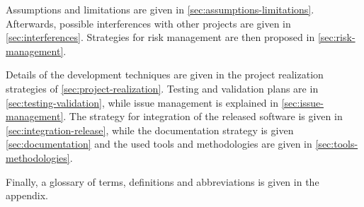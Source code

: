 Assumptions and limitations are given in \autoref{sec:assumptions-limitations}.
Afterwards, possible interferences with other projects are given in \autoref{sec:interferences}.
Strategies for risk management are then proposed in \autoref{sec:risk-management}.

Details of the development techniques are given in the project realization strategies of \autoref{sec:project-realization}.
Testing and validation plans are in \autoref{sec:testing-validation}, while issue management is explained in \autoref{sec:issue-management}.
The strategy for integration of the released software is given in \autoref{sec:integration-release}, while the documentation strategy is given \autoref{sec:documentation} and the used tools and methodologies are given in \autoref{sec:tools-methodologies}.

Finally, a glossary of terms, definitions and abbreviations is given in the appendix.
